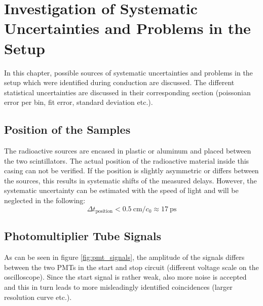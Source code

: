 \documentclass[
	paper=A4,
	parskip=full,
	chapterprefix=true,
	11pt,
	headings=normal,
	bibliography=totoc,
	listof=totoc,
	titlepage=on,
]{scrreprt}
\begin{document}
\chapter{Investigation of Systematic Uncertainties and Problems in the Setup}

In this chapter, possible sources of systematic uncertainties and problems in the setup which were identified during conduction are discussed. The different statistical uncertainties are discussed in their corresponding section (poissonian error per bin, fit error, standard deviation etc.).

\section{Position of the Samples}
The radioactive sources are encased in plastic or aluminum and placed between the two scintillators. The actual position of the radioactive material inside this casing can not be verified. If the position is slightly asymmetric or differs between the sources, this results in systematic shifts of the measured delays. However, the systematic uncertainty can be estimated with the speed of light and will be neglected in the following:
\begin{equation}
\Delta t_\textrm{position} < \SI{0.5}{\centi\meter} / c_0 \approx \SI{17}{\pico\second}   
\end{equation}

\section{Photomultiplier Tube Signals}
As can be seen in figure \ref{fig:pmt_signals}, the amplitude of the signals differs between the two PMTs in the start and stop circuit (different voltage scale on the oscilloscope). Since the start signal is rather weak, also more noise is accepted and this in turn leads to more misleadingly identified coincidences (larger resolution curve etc.).
\end{document}
